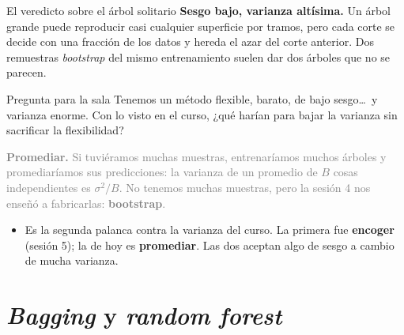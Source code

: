 \documentclass{beamer}
\newcommand{\1}{\mathbb{I}}
\begin{document}
\begin{frame}{El veredicto sobre el árbol solitario}
\small
\textbf{Sesgo bajo, varianza altísima.} Un árbol grande puede reproducir casi cualquier superficie por tramos, pero cada corte se decide con una fracción de los datos y hereda el azar del corte anterior. Dos remuestras \emph{bootstrap} del mismo entrenamiento suelen dar dos árboles que no se parecen.
\pause
\vspace{0.1cm}
\begin{block}{Pregunta para la sala}
Tenemos un método flexible, barato, de bajo sesgo\ldots\ y varianza enorme. Con lo visto en el curso, ¿qué harían para bajar la varianza sin sacrificar la flexibilidad?
\end{block}
\pause
\textcolor{gray}{\textbf{Promediar.} Si tuviéramos muchas muestras, entrenaríamos muchos árboles y promediaríamos sus predicciones: la varianza de un promedio de $B$ cosas independientes es $\sigma^2/B$. No tenemos muchas muestras, pero la sesión 4 nos enseñó a fabricarlas: \textbf{bootstrap}.}
\pause
\vspace{0.1cm}
\begin{itemize}\itemsep2pt
  \item Es la segunda palanca contra la varianza del curso. La primera fue \textbf{encoger} (sesión 5); la de hoy es \textbf{promediar}. Las dos aceptan algo de sesgo a cambio de mucha varianza.
\end{itemize}
\end{frame}


\section{\emph{Bagging} y \emph{random forest}}
\begin{frame}[noframenumbering]
\tableofcontents[currentsection]
\end{frame}
\end{document}
